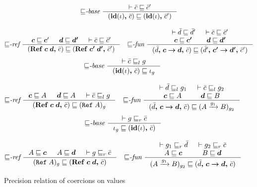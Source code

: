 \begin{figure}[tbp]
\raggedright
  {\small
  \begin{gather*}
    {\sqsubseteq}\textit{-base}~
    \inference{\vdash \bar{c} \sqsubseteq \bar{c}'}
              {(\coerc{\id{\iota}}{\bar{c}}) \sqsubseteq (\coerc{\id{\iota}}{\bar{c}'})}
    \\[2ex]
    {\sqsubseteq}\textit{-ref}~
    \inference{\bm{c} \sqsubseteq \bm{c}' & \bm{d} \sqsubseteq \bm{d'} &
               \vdash \bar{c} \sqsubseteq \bar{c}'}
              {(\coerc{\refco{\bm{c}}{\bm{d}}}{\bar{c}}) \sqsubseteq (\coerc{\refco{\bm{c'}}{\bm{d'}}}{\bar{c}'})}
    \quad
    {\sqsubseteq}\textit{-fun}~
    \inference{\vdash \bar{d} \sqsubseteq \bar{d}' & \vdash \bar{c} \sqsubseteq \bar{c}' \\
               \bm{c} \sqsubseteq \bm{c'} & \bm{d} \sqsubseteq \bm{d'}}
              {(\coerc{\funco{\bar{d}}{\bm{c}}{\bm{d}}}{\bar{c}}) \sqsubseteq
                (\coerc{\funco{\bar{d}'}{\bm{c'}}{\bm{d'}}}{\bar{c}'})}
  \end{gather*}}
  {\small
  \begin{gather*}
    {\sqsubseteq}\textit{-base}~
    \inference{\vdash \bar{c} \sqsubseteq_l g}
              {(\coerc{\id{\iota}}{\bar{c}}) \sqsubseteq \iota_g}
    \\[2ex]
    {\sqsubseteq}\textit{-ref}~
      \inference{\bm{c} \sqsubseteq A & \bm{d} \sqsubseteq A &
        \vdash \bar{c} \sqsubseteq_l g}
                {(\coerc{\refco{\bm{c}}{\bm{d}}}{\bar{c}}) \sqsubseteq (\Refer{A})_g}
    \quad
    {\sqsubseteq}\textit{-fun}~
      \inference{\vdash \bar{d} \sqsubseteq_l g_1 & \vdash \bar{c} \sqsubseteq_l g_2 \\
        \bm{c} \sqsubseteq A & \bm{d} \sqsubseteq B}
    {(\coerc{\funco{\bar{d}}{\bm{c}}{\bm{d}}}{\bar{c}}) \sqsubseteq
                  (\Fun{A}{g_1}{B})_{g_2}}
  \end{gather*}}
  {\small
    \begin{gather*}
      {\sqsubseteq}\textit{-base}~
      \inference{\vdash g \sqsubseteq_r \bar{c}}
                {\iota_g \sqsubseteq (\coerc{\id{\iota}}{\bar{c}})}
      \\[2ex]
      {\sqsubseteq}\textit{-ref}~
      \inference{A \sqsubseteq \bm{c} & A \sqsubseteq \bm{d} &
        \vdash g \sqsubseteq_r \bar{c}}
                {(\Refer{A})_g \sqsubseteq (\coerc{\refco{\bm{c}}{\bm{d}}}{\bar{c}})}
      \quad
      {\sqsubseteq}\textit{-fun}~
      \inference{\vdash g_1 \sqsubseteq_r \bar{d} & \vdash g_2 \sqsubseteq_r \bar{c} \\
        A \sqsubseteq \bm{c} & B \sqsubseteq \bm{d}}
                {(\Fun{A}{g_1}{B})_{g_2} \sqsubseteq
                  (\coerc{\funco{\bar{d}}{\bm{c}}{\bm{d}}}{\bar{c}})  }
       \end{gather*}}
  \caption{Precision relation of coercions on values}
  \label{fig:coercion-prec}
\end{figure}

